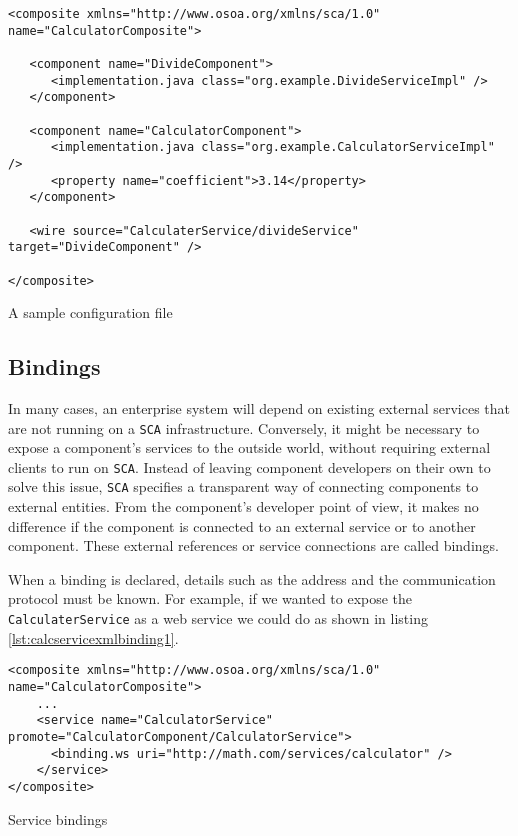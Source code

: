 \begin{listing}
\begin{verbatim}
<composite xmlns="http://www.osoa.org/xmlns/sca/1.0" name="CalculatorComposite">

   <component name="DivideComponent">
      <implementation.java class="org.example.DivideServiceImpl" />
   </component>

   <component name="CalculatorComponent">
      <implementation.java class="org.example.CalculatorServiceImpl" />
      <property name="coefficient">3.14</property>
   </component>
   
   <wire source="CalculaterService/divideService" target="DivideComponent" />

</composite>
\end{verbatim}
\caption{A sample configuration file}
\label{lst:calcservicexmlwires}
\end{listing}

\subsection{Bindings}

In many cases, an enterprise system will depend on existing external services that are not running on a \texttt{SCA} infrastructure.
Conversely, it might be necessary to expose a component's services to the outside world, without requiring external clients
to run on \texttt{SCA}. Instead of leaving component developers on their own to solve this issue, \texttt{SCA} specifies
a transparent way of connecting components to external entities. From the component's developer point of view, it makes
no difference if the component is connected to an external service or to another component. These external references or service
connections are called bindings.

When a binding is declared, details such as the address and the communication protocol must be known. For example, if we
wanted to expose the \texttt{CalculaterService} as a web service we could do as shown in listing \ref{lst:calcservicexmlbinding1}.

\begin{listing}
\begin{verbatim}
<composite xmlns="http://www.osoa.org/xmlns/sca/1.0" name="CalculatorComposite">
    ...
    <service name="CalculatorService" promote="CalculatorComponent/CalculatorService">
      <binding.ws uri="http://math.com/services/calculator" />
    </service>
</composite>
\end{verbatim}
\caption{Service bindings}
\label{lst:calcservicexmlbinding1}
\end{listing}

